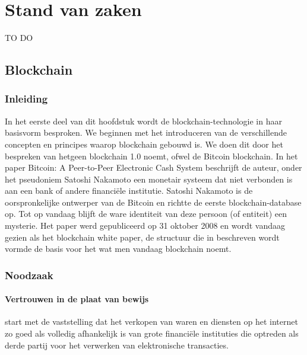 \chapter{Stand van zaken}
\label{ch:stand-van-zaken}



TO DO

\newpage
\section{Blockchain}
\label{sec:blockchain}
	\subsection*{Inleiding}
	In het eerste deel van dit hoofdstuk wordt de blockchain-technologie in haar basisvorm besproken. We beginnen met het introduceren  van  de verschillende concepten en principes waarop blockchain gebouwd is.  We doen dit door het bespreken van hetgeen \textcite{Swan2015} blockchain 1.0 noemt, ofwel de Bitcoin blockchain. In het paper Bitcoin: A Peer-to-Peer Electronic Cash System beschrijft de auteur, onder het pseudoniem Satoshi Nakamoto een monetair systeem dat niet verbonden is aan een bank of  andere financiële institutie. Satoshi Nakamoto is de oorspronkelijke ontwerper van de Bitcoin en richtte de eerste blockchain-database op. Tot op vandaag blijft de ware identiteit van deze persoon (of entiteit) een mysterie. Het paper werd gepubliceerd op 31 oktober 2008 en wordt vandaag gezien als het blockchain white paper,  de structuur die in \textcite{Nakamoto2008} beschreven wordt vormde de basis voor het wat men vandaag blockchain noemt.
	\subsection{Noodzaak}
			\subsubsection{Vertrouwen in de plaat van bewijs}
			\textcite{Nakamoto2008} start met de vaststelling dat het verkopen van waren en diensten op het internet zo goed als volledig afhankelijk is van grote financiële instituties die optreden als derde partij voor het verwerken van elektronische transacties. 
		

